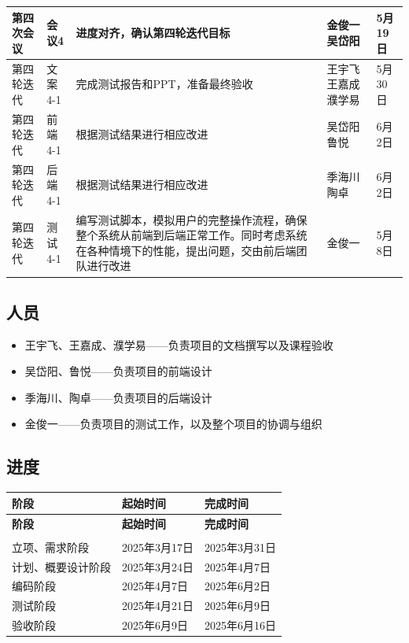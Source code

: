 \documentclass[12pt,a4paper,UTF8]{article}
\begin{document}
\begin{xltabular}{\linewidth}{|>{\centering\arraybackslash}p{2.2cm}|>{\centering\arraybackslash}p{2cm}|>{\raggedright\arraybackslash}p{6cm}|>{\centering\arraybackslash}p{1.5cm}|>{\centering\arraybackslash}p{2cm}|}
  第四次会议 & 会议4 & 进度对齐，确认第四轮迭代目标 & 金俊一 吴岱阳 & 5月19日 \\ \hline
  第四轮迭代 & 文案4-1 & 完成测试报告和PPT，准备最终验收 & 王宇飞 王嘉成 濮学易 & 5月30日 \\ \hline
  第四轮迭代 & 前端4-1 & 根据测试结果进行相应改进 & 吴岱阳 鲁悦 & 6月2日 \\ \hline
  第四轮迭代 & 后端4-1 & 根据测试结果进行相应改进 & 季海川 陶卓 & 6月2日 \\ \hline
  第四轮迭代 & 测试4-1 & 编写测试脚本，模拟用户的完整操作流程，确保整个系统从前端到后端正常工作。同时考虑系统在各种情境下的性能，提出问题，交由前后端团队进行改进 & 金俊一 & 5月8日 \\ \hline
\end{xltabular}

\subsection{人员}
\begin{itemize}
  \item 王宇飞、王嘉成、濮学易——负责项目的文档撰写以及课程验收
  \item 吴岱阳、鲁悦——负责项目的前端设计
  \item 季海川、陶卓——负责项目的后端设计
  \item 金俊一——负责项目的测试工作，以及整个项目的协调与组织
\end{itemize}

\subsection{进度}

\begin{xltabular}{\linewidth}{|>{\centering\arraybackslash}p{4cm}|>{\centering\arraybackslash}p{4cm}|>{\centering\arraybackslash}p{4cm}|}
  \hline
  \textbf{阶段} & \textbf{起始时间} & \textbf{完成时间} \\ \hline 
  \endfirsthead
  
  \hline
  \textbf{阶段} & \textbf{起始时间} & \textbf{完成时间} \\ \hline  
  \endhead
  
  \hline
   \\ 
  \endfoot

  \hline \endlastfoot

  立项、需求阶段 & 2025年3月17日 & 2025年3月31日 \\ \hline
  计划、概要设计阶段 & 2025年3月24日 & 2025年4月7日 \\ \hline
  编码阶段 & 2025年4月7日 & 2025年6月2日 \\ \hline
  测试阶段 & 2025年4月21日 & 2025年6月9日 \\ \hline
  验收阶段 & 2025年6月9日 & 2025年6月16日 \\ \hline
\end{xltabular}
\end{document}
